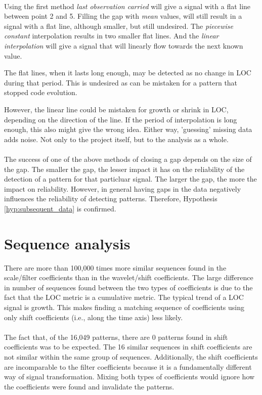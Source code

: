 \paragraph{}
Using the first method \emph{last observation carried }\rm will give a signal
with a flat line between point 2 and 5. Filling the gap with \emph{mean }\rm
values, will still result in a signal with a flat line, although smaller, but
still undesired. The \emph{piecewise constant }\rm interpolation results in two
smaller flat lines. And the \emph{linear interpolation }\rm will give a signal
that will linearly flow towards the next known value. 

The flat lines, when it lasts long enough, may be detected as no change in LOC
during that period. This is undesired as can be mistaken for a pattern that
stopped code evolution.

However, the linear line could be mistaken for growth or shrink in LOC,
depending on the direction of the line. If the period of interpolation is long
enough, this also might give the wrong idea. Either way, 'guessing' missing data
adds noise. Not only to the project itself, but to the analysis as a whole.

\paragraph{}
The success of one of the above methods of closing a gap depends on the size of
the gap. The smaller the gap, the lesser impact it has on the reliability of
the detection of a pattern for that particluar signal. The larger the gap, the
more the impact on reliability. However, in general having gaps in the data
negatively influences the reliability of detecting patterns. Therefore,
Hypothesis \ref{hyp:subsequent_data} is confirmed.

\section{Sequence analysis}
There are more than 100,000 times more similar sequences found in the
scale/filter coefficients than in the wavelet/shift coefficients. The large
difference in number of sequences found between the two types of coefficients
is due to the fact that the LOC metric is a cumulative metric. The typical
trend of a LOC signal is growth. This makes finding a matching sequence of
coefficients using only shift coefficients (i.e., along the time axis) less
likely.

\paragraph{}
The fact that, of the 16,049 patterns, there are 0 patterns found in shift
coefficients was to be expected. The 16 similar sequences in shift coefficients
are not similar within the same group of sequences. Additionally, the shift
coefficients are incomparable to the filter coefficients because it is a
fundamentally different way of signal transformation. Mixing both types of
coefficients would ignore how the coefficients were found and invalidate the
patterns.

